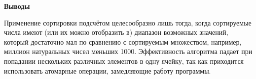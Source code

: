 \textbf{\large Выводы}

Применение сортировки подсчётом целесообразно лишь тогда, когда сортируемые числа имеют (или их можно отобразить в) диапазон возможных значений, который достаточно мал по сравнению с сортируемым множеством, например, миллион натуральных чисел меньших 1000. Эффективность алгоритма падает при попадании нескольких различных элементов в одну ячейку, так как приходится использовать атомарные операции, замедляющие работу программы.